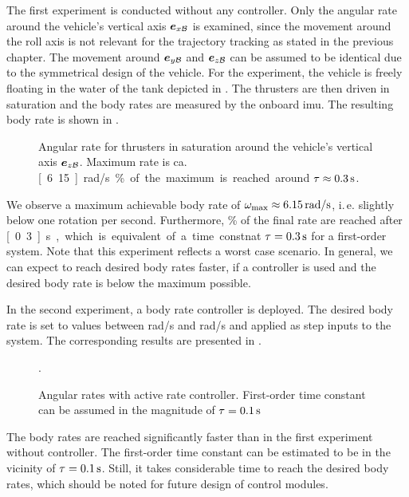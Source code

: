 The first experiment is conducted without any controller. Only the angular rate around the vehicle's vertical axis $\mbox{$\bm{e}$}_{x\mathcal{B}}$ is examined, since the movement around the roll axis is not relevant for the trajectory tracking as stated in the previous chapter. The movement around $\mbox{$\bm{e}$}_{y\mathcal{B}}$ and $\mbox{$\bm{e}$}_{z\mathcal{B}}$ can be assumed to be identical due to the symmetrical design of the vehicle. For the experiment, the vehicle is freely floating in the water of the tank depicted in . The thrusters are then driven in saturation and the body rates are measured by the onboard \ac{imu}. The resulting body rate is shown in .
\begin{figure}
	\centering
	\caption{Angular rate for thrusters in saturation around the vehicle's vertical axis $\mbox{$\bm{e}$}_{z\mathcal{B}}$. Maximum rate is ca. \unit[6.15]{rad/s}. \unit[63]{\%} of the maximum is reached around $\tau \approx \unit[0.3]{s}$.}
	\label{fig:body-rate-saturation}
\end{figure}
We observe a maximum achievable body rate of $\omega_{\max}\approx \unit[6.15]{rad/s}$, i.\,e. slightly below one rotation per second.
Furthermore, \unit[63]{\%} of the final rate are reached after \unit[0.3]{s}, which is equivalent of a time constnat $\tau = \unit[0.3]{s}$ for a first-order system.
Note that this experiment reflects a worst case scenario.
In general, we can expect to reach desired body rates faster, if a controller is used and the desired body rate is below the maximum possible.

In the second experiment, a body rate controller is deployed. The desired body rate is set to values between \unit[1]{rad/s} and \unit[4]{rad/s} and applied as step inputs to the system. The corresponding results are presented in .
\begin{figure}
	\centering
	
	\caption{Angular rates with active rate controller. First-order time constant can be assumed in the magnitude of $\tau=\unit[0.1]{s}$}.
	\label{fig:body-rate-controlled}
\end{figure}
The body rates are reached significantly faster than in the first experiment without controller.
The first-order time constant can be estimated to be in the vicinity of $\tau=\unit[0.1]{s}$. Still, it takes considerable time to reach the desired body rates, which should be noted for future design of control modules.

